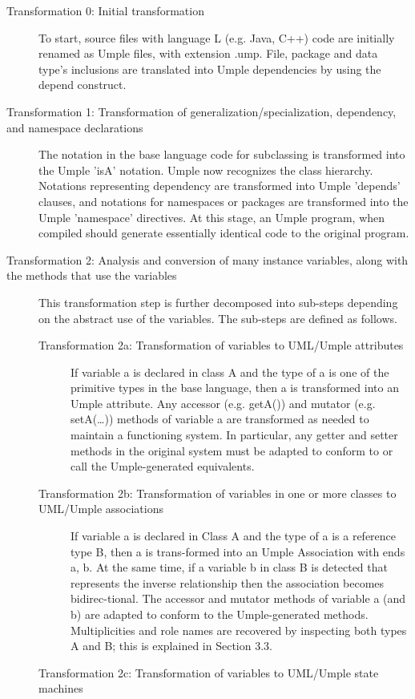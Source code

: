 \begin{description} 
\item[Transformation 0: Initial transformation] 
To start, source files with language L (e.g. Java, C++) code are initially renamed as Umple files, with extension .ump. File, package and data type's inclusions are translated into Umple dependencies by using the depend construct. 
\item [Transformation 1: Transformation of generalization/specialization, dependency, and namespace declarations]
The notation in the base language code for subclassing is transformed into the Umple 'isA' notation. Umple now recognizes the class hierarchy.  Notations representing dependency are transformed into Umple 'depends' clauses, and notations for namespaces or packages are transformed into the Umple 'namespace' directives. At this stage, an Umple program, when compiled should generate essentially identical code to the original program.
\item [Transformation 2: Analysis and conversion of many instance variables, along with the methods that use the variables]
This transformation step is further decomposed into sub-steps depending on the abstract use of the variables. The sub-steps are defined as follows.
   \begin{description}
\item [Transformation 2a: Transformation of variables to UML/Umple attributes]
If variable a is declared in class A and the type of a is one of the primitive types in the base language, then a is transformed into an Umple attribute. Any accessor (e.g. getA()) and mutator (e.g. setA(…)) methods of variable a are transformed as needed to maintain a functioning system. In particular, any getter and setter methods in the original system must be adapted to conform to or call the Umple-generated equivalents.
\item [Transformation 2b: Transformation of variables in one or more classes to UML/Umple associations]
If variable a is declared in Class A and the type of a is a reference type B, then a is trans-formed into an Umple Association with ends {a, b}. At the same time, if a variable b in class B is detected that represents the inverse relationship then the association becomes bidirec-tional. The accessor and mutator methods of variable a (and b) are adapted to conform to the Umple-generated methods. Multiplicities and role names are recovered by inspecting both types A and B; this is explained in Section 3.3. 
\item [Transformation 2c: Transformation of variables to UML/Umple state machines]

\end{description}
\end{description}
